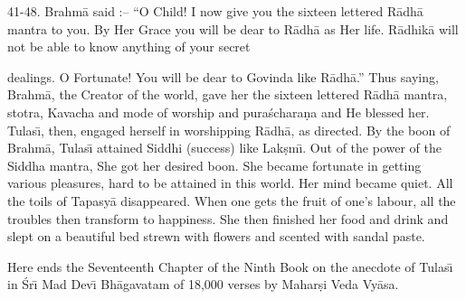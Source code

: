 41-48. Brahm\=a said :-- ``O Child! I now give you the sixteen lettered R\=adh\=a mantra to you. By Her Grace you will be dear to R\=adh\=a as Her life. R\=adhik\=a will not be able to know anything of your secret

dealings. O Fortunate! You will be dear to Govinda like R\=adh\=a.'' Thus saying, Brahm\=a, the Creator of the world, gave her the sixteen lettered R\=adh\=a mantra, stotra, Kavacha and mode of worship and pura\'schara\d{n}a and He blessed her. Tulas\={\i}, then, engaged herself in worshipping R\=adh\=a, as directed. By the boon of Brahm\=a, Tulas\={\i} attained Siddhi (success) like Lak\d{s}m\={\i}. Out of the power of the Siddha mantra, She got her desired boon. She became fortunate in getting various pleasures, hard to be attained in this world. Her mind became quiet. All the toils of Tapasy\=a disappeared. When one gets the fruit of one's labour, all the troubles then transform to happiness. She then finished her food and drink and slept on a beautiful bed strewn with flowers and scented with sandal paste.

Here ends the Seventeenth Chapter of the Ninth Book on the anecdote of Tulas\={\i} in \'Sr\={\i} Mad Dev\={\i} Bh\=agavatam of 18,000 verses by Mahar\d{s}i Veda Vy\=asa.



